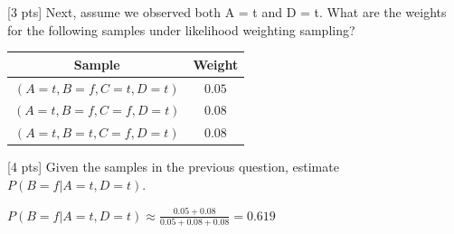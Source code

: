 \begin{question}{}
  [3 pts] Next, assume we observed both A = t and D = t. What are the weights for the following samples
 under likelihood weighting sampling?
\begin{center}
\begin{tabular}{|c|c|}
\hline
 Sample & Weight  \\
 \hline
 $(A=t,B=f,C=t,D=t)$ & $0.05$\\
 \hline
 $(A=t,B=f,C=f,D=t)$ & $0.08$\\
 \hline
 $(A=t,B=t,C=f,D=t)$ & $0.08$\\
 \hline
\end{tabular}
\end{center}
\end{question}


\begin{question}{}
  [4 pts] Given the samples in the previous question, estimate $P(B=f| A=t, D=t)$.
\end{question}
\begin{minipage}{\textwidth}
\qquad \qquad $P(B=f|A=t,D=t) \approx \frac{0.05+0.08}{0.05+0.08+0.08} = 0.619$
\end{minipage}
\vspace{1.5cm}

